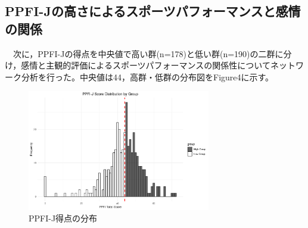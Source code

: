 \documentclass[12pt,a4paper,xelatex,ja=standard]{bxjsarticle}
\begin{document}
\hypertarget{ppfi-jux306eux9ad8ux3055ux306bux3088ux308bux30b9ux30ddux30fcux30c4ux30d1ux30d5ux30a9ux30fcux30deux30f3ux30b9ux3068ux611fux60c5ux306eux95a2ux4fc2}{%
\subsection{PPFI-Jの高さによるスポーツパフォーマンスと感情の関係}\label{ppfi-jux306eux9ad8ux3055ux306bux3088ux308bux30b9ux30ddux30fcux30c4ux30d1ux30d5ux30a9ux30fcux30deux30f3ux30b9ux3068ux611fux60c5ux306eux95a2ux4fc2}}

　次に，PPFI-Jの得点を中央値で高い群(n=178)と低い群(n=190)の二群に分け，感情と主観的評価によるスポーツパフォーマンスの関係性についてネットワーク分析を行った。中央値は44，高群・低群の分布図をFigure4に示す。

\begin{figure}[H]
\centering
\includegraphics[clip,width = 8cm]{figure/Figure4.png}
\caption{PPFI-J得点の分布}
\end{figure}
\end{document}
